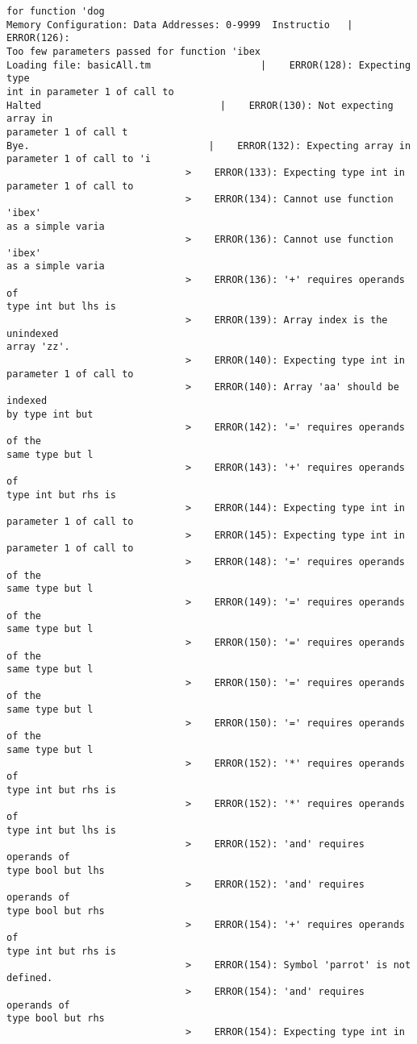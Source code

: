 \documentclass[12pt]{book}
\begin{document}
\begin{lstlisting}
for function 'dog
Memory Configuration: Data Addresses: 0-9999  Instructio   |    ERROR(126): 
Too few parameters passed for function 'ibex
Loading file: basicAll.tm                   |    ERROR(128): Expecting type 
int in parameter 1 of call to
Halted                               |    ERROR(130): Not expecting array in
parameter 1 of call t
Bye.                               |    ERROR(132): Expecting array in 
parameter 1 of call to 'i
                               >    ERROR(133): Expecting type int in 
parameter 1 of call to
                               >    ERROR(134): Cannot use function 'ibex' 
as a simple varia
                               >    ERROR(136): Cannot use function 'ibex' 
as a simple varia
                               >    ERROR(136): '+' requires operands of 
type int but lhs is
                               >    ERROR(139): Array index is the unindexed
array 'zz'.
                               >    ERROR(140): Expecting type int in 
parameter 1 of call to
                               >    ERROR(140): Array 'aa' should be indexed
by type int but
                               >    ERROR(142): '=' requires operands of the
same type but l
                               >    ERROR(143): '+' requires operands of 
type int but rhs is
                               >    ERROR(144): Expecting type int in 
parameter 1 of call to
                               >    ERROR(145): Expecting type int in 
parameter 1 of call to
                               >    ERROR(148): '=' requires operands of the
same type but l
                               >    ERROR(149): '=' requires operands of the
same type but l
                               >    ERROR(150): '=' requires operands of the
same type but l
                               >    ERROR(150): '=' requires operands of the
same type but l
                               >    ERROR(150): '=' requires operands of the
same type but l
                               >    ERROR(152): '*' requires operands of 
type int but rhs is
                               >    ERROR(152): '*' requires operands of 
type int but lhs is
                               >    ERROR(152): 'and' requires operands of 
type bool but lhs
                               >    ERROR(152): 'and' requires operands of 
type bool but rhs
                               >    ERROR(154): '+' requires operands of 
type int but rhs is
                               >    ERROR(154): Symbol 'parrot' is not 
defined.
                               >    ERROR(154): 'and' requires operands of 
type bool but rhs
                               >    ERROR(154): Expecting type int in 

\end{lstlisting}
\end{document}
